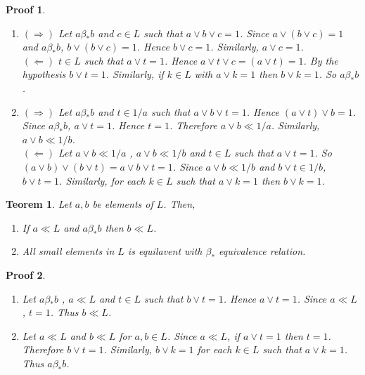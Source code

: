 \documentclass[a4paper,12pt]{article}
\numberwithin{equation}{section}
\theoremstyle{italik}
\newtheorem{teorem}{Teorem}[section]
\newtheorem*{ispat}{Proof}
\begin{document}
\begin{ispat}
  \begin{enumerate}
    \item
      $ ( \Rightarrow ) $
      Let $ a \beta_* b$ and $ c \in L $ such that $ a \vee b \vee c = 1 $. Since $ a \vee ( b \vee c ) = 1 $ and 
      $ a \beta_* b $, $ b \vee ( b \vee c ) = 1 $. Hence $ b \vee c = 1 $. Similarly, $ a \vee c = 1 $. \\
      $( \Leftarrow )$
      $ t \in L $ such that $ a \vee t = 1 $. 
      Hence $ a \vee t \vee c = ( a \vee t ) = 1 $. By the hypothesis $ b \vee t = 1 $. 
      Similarly, if $ k \in L $ with $ a \vee k = 1 $ then $ b \vee k = 1 $. So $ a \beta_* b $.
    \item
      $ ( \Rightarrow ) $
      Let $ a \beta_* b $ and $ t \in 1/a $ such that $ a \vee b \vee t = 1 $. 
      Hence $ ( a \vee t ) \vee b = 1 $. Since $ a \beta_* b $, $ a \vee t = 1 $. 
      Hence $ t=1 $. Therefore $ a \vee b \ll 1/a $. Similarly, $ a \vee b \ll 1/b $. \\
      $( \Leftarrow )$
      Let $ a \vee b \ll 1/a $ , $ a \vee b \ll 1/b $ and $ t \in L $ such that $ a \vee t = 1 $. 
      So $ ( a \vee b ) \vee ( b \vee t ) = a \vee b \vee t = 1 $. Since $ a \vee b \ll 1/b $ and 
      $ b \vee t \in 1/b $, $ b \vee t = 1 $. 
      Similarly, for each $ k \in L $ such that $ a \vee k = 1 $ then $ b \vee k = 1 $. 
  \end{enumerate}
\end{ispat}

\begin{teorem} \label{4}
  Let $ a,b $ be elements of $ L $. Then,
  \begin{enumerate}
    \item
      If $ a \ll L $ and $ a \beta_* b $ then $ b \ll L $.
    \item
      All small elements in $ L $ is equilavent with $ \beta_* $ equivalence relation.
  \end{enumerate}
\end{teorem}

\begin{ispat}
  \begin{enumerate}
    \item
      Let $ a \beta_* b $ , $ a \ll L $ and $ t \in L $ such that $ b \vee t = 1 $. 
      Hence $ a \vee t = 1 $. Since $ a \ll L $, $ t = 1 $. Thus $ b \ll L $. 
    \item
      Let $ a \ll L $ and $ b \ll L $ for $ a,b \in L $. Since $ a \ll L $, if $ a \vee t = 1 $ 
      then $ t = 1 $. Therefore $ b \vee t = 1 $. 
      Similarly, $ b \vee k = 1 $ for each $ k \in L $ such that $ a \vee k = 1 $. 
      Thus $ a \beta_* b $. 
  \end{enumerate}
\end{ispat}
\end{document}
